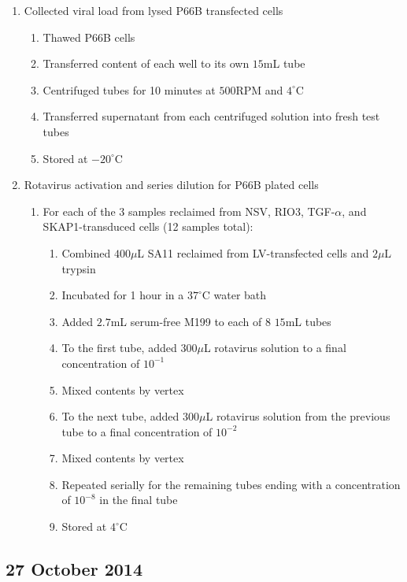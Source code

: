 \begin{enumerate}
	\item Collected viral load from lysed P66B transfected cells
		\begin{enumerate}
			\item Thawed P66B cells
			\item Transferred content of each well to its own $15$mL tube
			\item Centrifuged tubes for 10 minutes at $500$RPM and $4^{\circ}$C
			\item Transferred supernatant from each centrifuged solution into fresh test tubes
			\item Stored at $-20^{\circ}$C
		\end{enumerate}
	\item Rotavirus activation and series dilution for P66B plated cells
		\begin{enumerate}
			\item For each of the 3 samples reclaimed from NSV, RIO3, TGF-$\alpha$, and SKAP1-transduced cells (12 samples total):
				\begin{enumerate}
					\item Combined $400\mu$L SA11 reclaimed from LV-transfected cells and $2\mu$L trypsin
					\item Incubated for 1 hour in a $37^{\circ}$C water bath
					\item Added $2.7$mL serum-free M199 to each of 8 $15$mL tubes
					\item To the first tube, added $300\mu$L rotavirus solution to a final concentration of $10^{-1}$
					\item Mixed contents by vertex
					\item To the next tube, added $300\mu$L rotavirus solution from the previous tube to a final concentration of $10^{-2}$
					\item Mixed contents by vertex
					\item Repeated serially for the remaining tubes ending with a concentration of $10^{-8}$ in the final tube
					\item Stored at $4^{\circ}$C
				\end{enumerate}
		\end{enumerate}
\end{enumerate}

\subsection*{27 October 2014}

